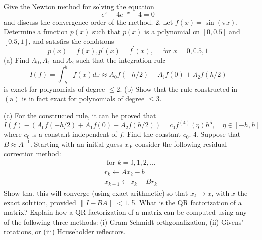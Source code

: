 \documentclass[14pt]{extarticle}
\begin{document}
\newpage
Give the Newton method for solving the equation
$$
e^{x}+4 e^{-x}-4=0
$$
and discuss the convergence order of the method. 2. Let $f(x)=\sin (\pi x)$.
\newpage
Determine a function $p(x)$ such that $p(x)$ is a polynomial on $[0,0.5]$ and $[0.5,1]$, and satisfies the conditions
$$
p(x)=f(x), p^{\prime}(x)=f^{\prime}(x), \quad \text { for } x=0,0.5,1
$$
\newpage
(a) Find $A_{0}, A_{1}$ and $A_{2}$ such that the integration rule
$$
I(f)=\int_{-h}^{h} f(x) d x \approx A_{0} f(-h / 2)+A_{1} f(0)+A_{2} f(h / 2)
$$
is exact for polynomials of degree $\leq 2$.
(b) Show that the rule constructed in $(\mathrm{a})$ is in fact exact for polynomials of degree $\leq 3$.

(c) For the constructed rule, it can be proved that
$$
I(f)-\left(A_{0} f(-h / 2)+A_{1} f(0)+A_{2} f(h / 2)\right)=c_{0} f^{(4)}(\eta) h^{5}, \quad \eta \in[-h, h]
$$
where $c_{0}$ is a constant independent of $f$. Find the constant $c_{0}$.
\newpage
4. Suppose that $B \approx A^{-1}$. Starting with an initial guess $x_{0}$, consider the following residual correction method:
$$
\begin{aligned}
&\text { for } k=0,1,2, \ldots \\
&r_{k} \longleftarrow A x_{k}-b \\
&x_{k+1} \leftarrow x_{k}-B r_{k}
\end{aligned}
$$
Show that this will converge (using exact arithmetic) so that $x_{k} \rightarrow x$, with $x$ the exact solution, provided $\|I-B A\|<1$.
\newpage
5. What is the QR factorization of a matrix? Explain how a QR factorization of a matrix can be computed using any of the following three methods: (i) Gram-Schmidt orthgonalization, (ii) Givens' rotations, or (iii) Householder reflectors.
\end{document}
